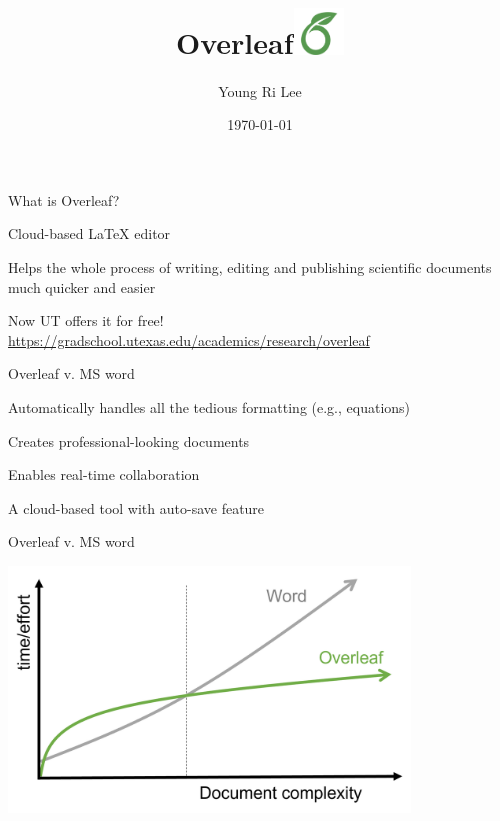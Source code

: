 \documentclass[13pt]{beamer}
\title{Overleaf\includegraphics[width=0.1\textwidth,keepaspectratio]{images/overleaf_og_logo.png}}
\author{Young Ri Lee}
\institute{QM Colloquium \\ The University of Texas at Austin}
\date{\today}
\newcommand{\itemA}{\item[\textcolor{black}{\textbullet}]}
\newcommand{\green}{\textcolor{colorgreen}}
\begin{document}
\begin{frame}[plain]
\maketitle
\end{frame}

\begin{frame}{What is Overleaf?}
 \begin{fullpageitemize}
    \itemA Cloud-based LaTeX editor
    \itemA Helps the whole process of writing, editing and publishing scientific documents much quicker and easier
    \itemA Now UT offers it for free!\\
    \green{\footnotesize{\url{https://gradschool.utexas.edu/academics/research/overleaf}}} \hfill \break
 \end{fullpageitemize}
 
\end{frame}

\begin{frame}{Overleaf v. MS word}

\begin{fullpageitemize}
    \itemA Automatically handles all the tedious formatting (e.g., equations) \green{} 
    \itemA Creates professional-looking documents  \green{} 
    \itemA Enables real-time collaboration \green{} 
    \itemA A cloud-based tool with auto-save feature \green{} 
    
 \end{fullpageitemize}
\end{frame}

\begin{frame}{Overleaf v. MS word}

\includegraphics[width=0.8\textwidth,keepaspectratio]{images/v_word.png}
\end{frame}
\end{document}
